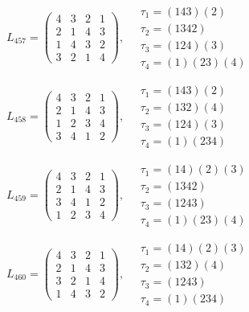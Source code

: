 $L_{457} = \begin{pmatrix} 4 & 3 & 2 & 1 \\ 2 & 1 & 4 & 3 \\ 1 & 4 & 3 & 2 \\ 3 & 2 & 1 & 4 \end{pmatrix}, \quad \begin{matrix} \tau_{1} = (1 4 3)(2) \\ \tau_{2} = (1 3 4 2) \\ \tau_{3} = (1 2 4)(3) \\ \tau_{4} = (1)(2 3)(4) \end{matrix}$

$L_{458} = \begin{pmatrix} 4 & 3 & 2 & 1 \\ 2 & 1 & 4 & 3 \\ 1 & 2 & 3 & 4 \\ 3 & 4 & 1 & 2 \end{pmatrix}, \quad \begin{matrix} \tau_{1} = (1 4 3)(2) \\ \tau_{2} = (1 3 2)(4) \\ \tau_{3} = (1 2 4)(3) \\ \tau_{4} = (1)(2 3 4) \end{matrix}$

$L_{459} = \begin{pmatrix} 4 & 3 & 2 & 1 \\ 2 & 1 & 4 & 3 \\ 3 & 4 & 1 & 2 \\ 1 & 2 & 3 & 4 \end{pmatrix}, \quad \begin{matrix} \tau_{1} = (1 4)(2)(3) \\ \tau_{2} = (1 3 4 2) \\ \tau_{3} = (1 2 4 3) \\ \tau_{4} = (1)(2 3)(4) \end{matrix}$

$L_{460} = \begin{pmatrix} 4 & 3 & 2 & 1 \\ 2 & 1 & 4 & 3 \\ 3 & 2 & 1 & 4 \\ 1 & 4 & 3 & 2 \end{pmatrix}, \quad \begin{matrix} \tau_{1} = (1 4)(2)(3) \\ \tau_{2} = (1 3 2)(4) \\ \tau_{3} = (1 2 4 3) \\ \tau_{4} = (1)(2 3 4) \end{matrix}$

